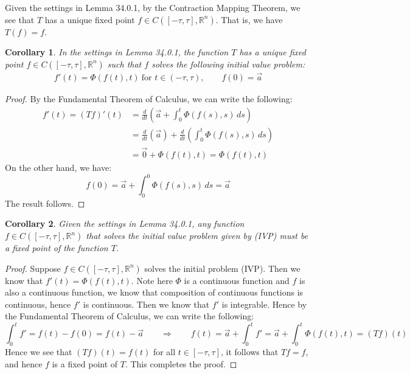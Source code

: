 \documentclass[15pt]{book}
\theoremstyle{break}
\theoremstyle{break}
\newtheorem{corL}{Corollary}[lem]
\newcommand{\R}{\mathbb{R}}
\begin{document}
Given the settings in Lemma 34.0.1, by the Contraction Mapping Theorem, we see that $T$ has a unique fixed point $f \in C([-\tau,\tau],\R^n)$. That is, we have $T(f) = f$. 
\newpage

\begin{corL}
In the settings in Lemma 34.0.1, the function $T$ has a unique fixed point $f \in C([-\tau,\tau],\R^n)$ such that $f$ solves the following initial value problem:
\begin{align*}
f'(t) = \Phi(f(t),t)\ \text{for }t\in(-\tau,\tau),\qquad f(0) = \vec{a} \tag{IVP}
\end{align*}
\end{corL}
\begin{proof}
By the Fundamental Theorem of Calculus, we can write the following: 
\begin{align*}
f'(t) = (Tf)'(t) &= \frac{d}{dt} \left(\vec{a}+\int_0^t\Phi(f(s),s)\, ds\right) \\
&=  \frac{d}{dt}\left(\vec{a}\right)+\frac{d}{dt}\left(\int_0^t\Phi(f(s),s)\, ds \right) \\
&=\vec{0}+ \Phi(f(t),t) =\Phi(f(t),t)
\end{align*}
On the other hand, we have:
$$f(0) = \vec{a}+\int_0^0\Phi(f(s),s)\, ds = \vec{a}$$
The result follows.
\end{proof}

\begin{corL}
Given the settings in Lemma 34.0.1, any function $f \in C([-\tau,\tau],\R^n)$ that solves the initial value problem given by (IVP) must be a fixed point of the function $T$.
\end{corL} 
\begin{proof}
Suppose $f\in C([-\tau,\tau],\R^n)$ solves the initial problem (IVP). Then we know that $f'(t) = \Phi(f(t),t)$. Note here $\Phi$ is a continuous function and $f$ is also a continuous function, we know that composition of continuous functions is continuous, hence $f'$ is continuous. Then we know that $f'$ is integrable. Hence by the Fundamental Theorem of Calculus, we can write the following:
$$\int_0^t f' = f(t) - f(0) =f(t) - \vec{a} \qquad \Rightarrow \qquad f(t) = \vec{a}+ \int_0^t f' = \vec{a}+ \int_0^t \Phi(f(t),t) = (Tf)(t)$$
Hence we see that $(Tf)(t) = f(t)$ for all $t \in [-\tau,\tau]$, it follows that $Tf = f$, and hence $f$ is a fixed point of $T$. This completes the proof.
\end{proof}
\end{document}
